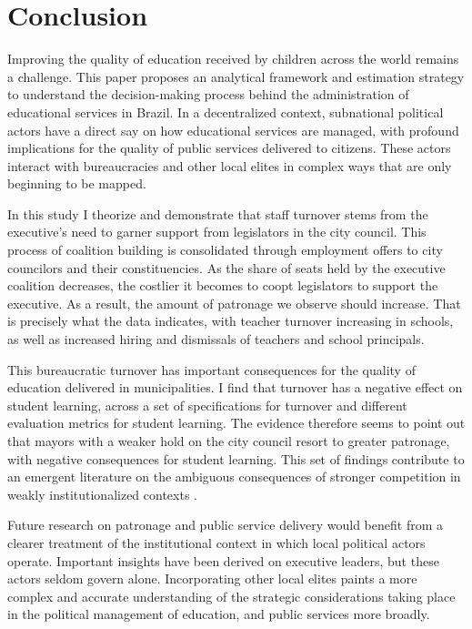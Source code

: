 \section{Conclusion}
\label{sec:conclusion}

Improving the quality of education received by children across the world remains a challenge. This paper proposes an analytical framework and estimation strategy to understand the decision-making process behind the administration of educational services in Brazil. In a decentralized context, subnational political actors have a direct say on how educational services are managed, with profound implications for the quality of public services delivered to citizens. These actors interact with bureaucracies and other local elites in complex ways that are only beginning to be mapped.

In this study I theorize and demonstrate that staff turnover stems from the executive's need to garner support from legislators in the city council. This process of coalition building is consolidated through employment offers to city councilors and their constituencies. As the share of seats held by the executive coalition decreases, the costlier it becomes to coopt legislators to support the executive. As a result, the amount of patronage we observe should increase. That is precisely what the data indicates, with teacher turnover increasing in schools, as well as increased hiring and dismissals of teachers and school principals.

This bureaucratic turnover has important consequences for the quality of education delivered in municipalities. I find that turnover has a negative effect on student learning, across a set of specifications for turnover and different evaluation metrics for student learning. The evidence therefore seems to point out that mayors with a weaker hold on the city council resort to greater patronage, with negative consequences for student learning. This set of findings contribute to an emergent literature on the ambiguous consequences of stronger competition in weakly institutionalized contexts \citep{gottlieb_countervailing_2019}.

Future research on patronage and public service delivery would benefit from a clearer treatment of the institutional context in which local political actors operate. Important insights have been derived on executive leaders, but these actors seldom govern alone. Incorporating other local elites paints a more complex and accurate understanding of the strategic considerations taking place in the political management of education, and public services more broadly.

